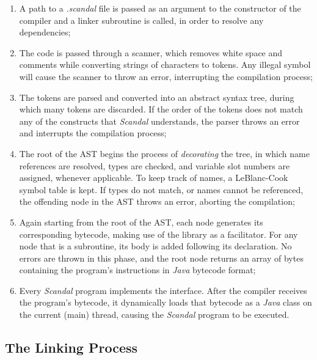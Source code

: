 \begin{enumerate}
	\item A path to a \emph{.scandal} file is passed as an argument to the constructor of the compiler and a linker subroutine is called, in order to resolve any dependencies;
	\item The code is passed through a scanner, which removes white space and comments while converting strings of characters to tokens. Any illegal symbol will cause the scanner to throw an error, interrupting the compilation process;
	\item The tokens are parsed and converted into an abstract syntax tree, during which many tokens are discarded. If the order of the tokens does not match any of the constructs that \emph{Scandal} understands, the parser throws an error and interrupts the compilation process;
	\item The root of the AST begins the process of \emph{decorating} the tree, in which name references are resolved, types are checked, and variable slot numbers are assigned, whenever applicable. To keep track of names, a LeBlanc-Cook symbol table is kept. If types do not match, or names cannot be referenced, the offending node in the AST throws an error, aborting the compilation;
	\item Again starting from the root of the AST, each node generates its corresponding bytecode, making use of the  library as a facilitator. For any node that is a subroutine, its body is added following its declaration. No errors are thrown in this phase, and the root node returns an array of bytes containing the program's instructions in \emph{Java} bytecode format;
	\item Every \emph{Scandal} program implements the  interface. After the compiler receives the program's bytecode, it dynamically loads that bytecode as a \emph{Java} class on the current (main) thread, causing the \emph{Scandal} program to be executed.
\end{enumerate}

\subsection{The Linking Process}

